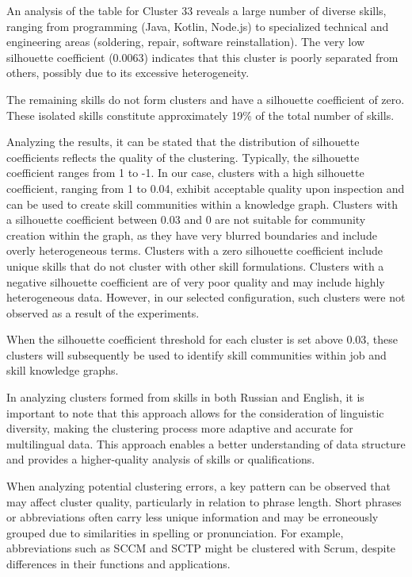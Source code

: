 \begin{multicols}{2}
An analysis of the table for Cluster 33 reveals a large number of
diverse skills, ranging from programming (Java, Kotlin, Node.js) to
specialized technical and engineering areas (soldering, repair, software
reinstallation). The very low silhouette coefficient (0.0063) indicates
that this cluster is poorly separated from others, possibly due to its
excessive heterogeneity.

The remaining skills do not form clusters and have a silhouette
coefficient of zero. These isolated skills constitute approximately 19\%
of the total number of skills.

Analyzing the results, it can be stated that the distribution of
silhouette coefficients reflects the quality of the clustering.
Typically, the silhouette coefficient ranges from 1 to -1. In our case,
clusters with a high silhouette coefficient, ranging from 1 to 0.04,
exhibit acceptable quality upon inspection and can be used to create
skill communities within a knowledge graph. Clusters with a silhouette
coefficient between 0.03 and 0 are not suitable for community creation
within the graph, as they have very blurred boundaries and include
overly heterogeneous terms. Clusters with a zero silhouette coefficient
include unique skills that do not cluster with other skill formulations.
Clusters with a negative silhouette coefficient are of very poor quality
and may include highly heterogeneous data. However, in our selected
configuration, such clusters were not observed as a result of the
experiments.

When the silhouette coefficient threshold for each cluster is set above
0.03, these clusters will subsequently be used to identify skill
communities within job and skill knowledge graphs.

In analyzing clusters formed from skills in both Russian and English, it
is important to note that this approach allows for the consideration of
linguistic diversity, making the clustering process more adaptive and
accurate for multilingual data. This approach enables a better
understanding of data structure and provides a higher-quality analysis
of skills or qualifications.

When analyzing potential clustering errors, a key pattern can be
observed that may affect cluster quality, particularly in relation to
phrase length. Short phrases or abbreviations often carry less unique
information and may be erroneously grouped due to similarities in
spelling or pronunciation. For example, abbreviations such as SCCM and
SCTP might be clustered with Scrum, despite differences in their
functions and applications.


\end{multicols}
